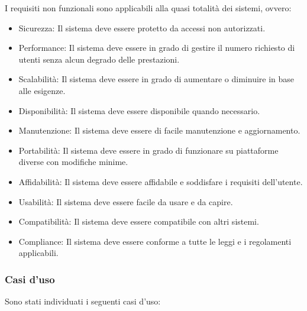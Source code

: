 \documentclass[a4paper,11pt]{article}
\begin{document}
I requisiti non funzionali sono applicabili alla quasi totalità dei sistemi, ovvero:

\begin{itemize}
  \item Sicurezza: Il sistema deve essere protetto da accessi non autorizzati.
  \item Performance: Il sistema deve essere in grado di gestire il numero richiesto di utenti senza alcun degrado delle prestazioni.
  \item Scalabilità: Il sistema deve essere in grado di aumentare o diminuire in base alle esigenze.
  \item Disponibilità: Il sistema deve essere disponibile quando necessario.
  \item Manutenzione: Il sistema deve essere di facile manutenzione e aggiornamento.
  \item Portabilità: Il sistema deve essere in grado di funzionare su piattaforme diverse con modifiche minime.
  \item Affidabilità: Il sistema deve essere affidabile e soddisfare i requisiti dell'utente.
  \item Usabilità: Il sistema deve essere facile da usare e da capire.
  \item Compatibilità: Il sistema deve essere compatibile con altri sistemi.
  \item Compliance: Il sistema deve essere conforme a tutte le leggi e i regolamenti applicabili.
\end{itemize}

\subsubsection{Casi d'uso}
Sono stati individuati i seguenti casi d'uso:
\end{document}
